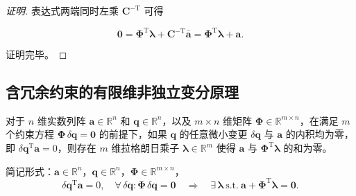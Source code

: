 \begin{proof}[证明]
表达式两端同时左乘 $\boldsymbol{C}^{-\mathrm{T}}$ 可得

\[
\boldsymbol{0}=\boldsymbol{\Phi}^{\mathrm{T}}\boldsymbol{\lambda}+\boldsymbol{C}^{-\mathrm{T}}\bar{\boldsymbol{a}}=\boldsymbol{\Phi}^{\mathrm{T}}\boldsymbol{\lambda}+\boldsymbol{a}.
\]

证明完毕。
\end{proof}
\subsection{含冗余约束的有限维非独立变分原理}
\begin{theorem}[含冗余约束的有限维非独立变分原理]
对于 $n$ 维实数列阵 $\boldsymbol{a}\in\mathbb{R}^n$ 和 $\boldsymbol{q}\in\mathbb{R}^n$，以及 $m\times n$ 维矩阵 $\boldsymbol{\Phi}\in\mathbb{R}^{m\times n}$，在满足 $m$ 个约束方程 $\boldsymbol{\Phi}\,\delta\boldsymbol{q}=\boldsymbol{0}$ 的前提下，如果 $\boldsymbol{q}$ 的任意微小变更 $\delta\boldsymbol{q}$ 与 $\boldsymbol{a}$ 的内积均为零，即 $\delta\boldsymbol{q}^{\mathrm{T}}\boldsymbol{a}=0$，则存在 $m$ 维拉格朗日乘子 $\boldsymbol{\lambda}\in\mathbb{R}^m$ 使得 $\boldsymbol{a}$ 与 $\boldsymbol{\Phi}^{\mathrm{T}}\boldsymbol{\lambda}$ 的和为零。
\end{theorem}
简记形式：$\boldsymbol{a}\in\mathbb{R}^n$，$\boldsymbol{q}\in\mathbb{R}^n$，$\boldsymbol{\Phi}\in\mathbb{R}^{m\times n}$，
\[
\delta\boldsymbol{q}^{\mathrm{T}}\boldsymbol{a}=0,\quad\forall\,\delta\boldsymbol{q}:\boldsymbol{\Phi}\,\delta\boldsymbol{q}=\boldsymbol{0}\quad\Rightarrow\quad\exists\,\boldsymbol{\lambda}\ \mathrm{s.t.}\ \boldsymbol{a}+\boldsymbol{\Phi}^{\mathrm{T}}\boldsymbol{\lambda}=\boldsymbol{0}.
\]
